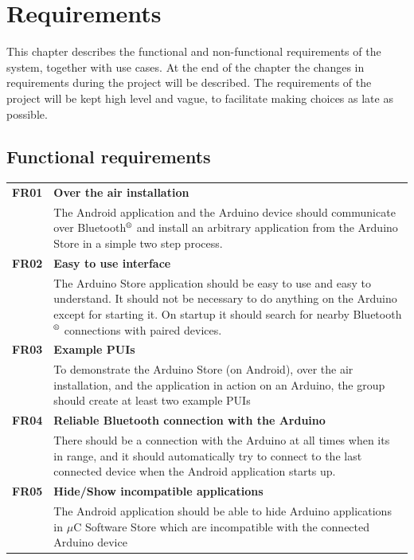 \chapter{Requirements}
This chapter describes the functional and non-functional requirements of the system, together with use cases. At the end of the chapter the changes in requirements during the project will be described.
The requirements of the project will be kept high level and vague, to facilitate making choices as late as possible.

\section{Functional requirements}
	\begin{table}[H]
	\begin{tabularx}{\linewidth}{lX}

		\textbf{FR01} & \textbf{Over the air installation}\\
 		              & The Android application and the Arduino device should communicate over 
                        Bluetooth$\textsuperscript{\textregistered}$  and install an arbitrary application from the Arduino Store in a simple two step process.\\

		\textbf{FR02} & \textbf{Easy to use interface}\\
                      & The Arduino Store application should be easy to use and easy to understand. It should not be necessary to do anything on the Arduino except for starting it. On startup it should search for nearby Bluetooth$\textsuperscript{\textregistered}$  connections with paired devices.\\

 		\textbf{FR03} & \textbf{Example PUIs}\\
                      & To demonstrate the Arduino Store (on Android), over the air installation, and the application in action on an Arduino, the group should create at least two example PUIs \\

		\textbf{FR04} & \textbf{Reliable Bluetooth connection with the Arduino}\\
                      & There should be a connection with the Arduino at all times when its in range, and it should automatically try to connect to the last connected device when the Android application starts up.\\

        \textbf{FR05} & \textbf{Hide/Show incompatible applications}\\
                      & The Android application should be able to hide Arduino applications in $\mu$C Software Store which are incompatible with the connected Arduino device\\


\end{tabularx}
\end{table}

